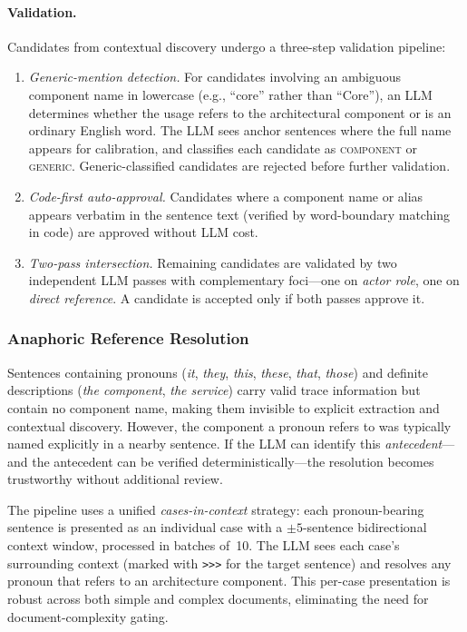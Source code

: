 \paragraph{Validation.}
Candidates from contextual discovery undergo a three-step validation
pipeline:

\begin{enumerate}
    \item \emph{Generic-mention detection.}
      For candidates involving an ambiguous component name in lowercase
      (e.g., ``core'' rather than ``Core''), an LLM determines whether
      the usage refers to the architectural component or is an ordinary
      English word.
      The LLM sees anchor sentences where the full name appears for
      calibration, and classifies each candidate as \textsc{component}
      or \textsc{generic}.
      Generic-classified candidates are rejected before further
      validation.
    \item \emph{Code-first auto-approval.}
      Candidates where a component name or alias appears verbatim
      in the sentence text (verified by word-boundary matching in
      code) are approved without LLM cost.
    \item \emph{Two-pass intersection.}
      Remaining candidates are validated by two independent LLM passes
      with complementary foci---one on \emph{actor role}, one on
      \emph{direct reference}.
      A candidate is accepted only if both passes approve it.
\end{enumerate}

\subsubsection{Anaphoric Reference Resolution}\label{sec:coref}

Sentences containing pronouns (\emph{it}, \emph{they}, \emph{this},
\emph{these}, \emph{that}, \emph{those}) and definite descriptions
(\emph{the component}, \emph{the service}) carry valid trace
information but contain no component name, making them invisible to
explicit extraction and contextual discovery.
However, the component a pronoun refers to was typically named
explicitly in a nearby sentence.
If the LLM can identify this \emph{antecedent}---and the antecedent
can be verified deterministically---the resolution becomes trustworthy
without additional review.

The pipeline uses a unified \emph{cases-in-context} strategy:
each pronoun-bearing sentence is presented as an individual case with
a $\pm5$-sentence bidirectional context window, processed in batches
of~10.
The LLM sees each case's surrounding context (marked with
\texttt{>>>} for the target sentence) and resolves any pronoun
that refers to an architecture component.
This per-case presentation is robust across both simple and complex
documents, eliminating the need for document-complexity gating.

